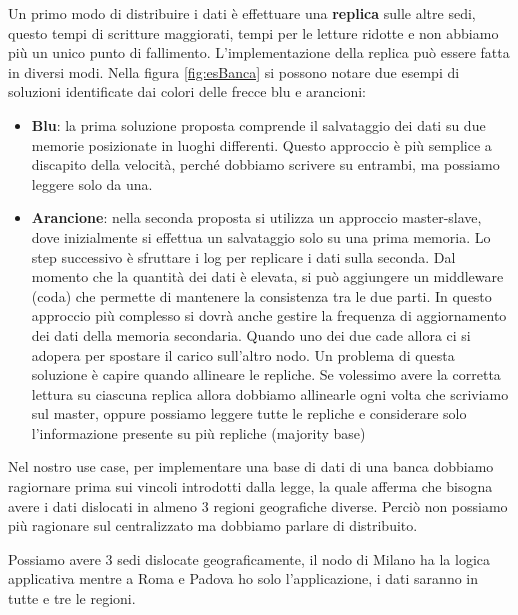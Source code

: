 Un primo modo di distribuire i dati è effettuare una \textbf{replica} sulle altre 
sedi, questo tempi di scritture maggiorati, tempi per le letture ridotte e 
non abbiamo più un unico punto di fallimento. L'implementazione della replica può
essere fatta in diversi modi. Nella figura \ref{fig:esBanca} si possono notare due 
esempi di soluzioni identificate dai colori delle frecce blu e arancioni:
\begin{itemize}
    \item \textbf{Blu}: la prima soluzione proposta comprende il salvataggio
          dei dati su due memorie posizionate in luoghi differenti. Questo approccio è più
          semplice a discapito della velocità, perché dobbiamo scrivere su entrambi,
          ma possiamo leggere solo da una.
    \item \textbf{Arancione}: nella seconda proposta si utilizza un approccio
          master-slave, dove inizialmente si effettua un salvataggio solo su una
          prima memoria. Lo step successivo è sfruttare i log per replicare i
          dati sulla seconda. Dal momento che la quantità dei dati è elevata,
          si può aggiungere un middleware (coda) che permette di mantenere la
          consistenza tra le due parti. In questo approccio più complesso si
          dovrà anche gestire la frequenza di aggiornamento dei dati della
          memoria secondaria. Quando uno dei due cade allora ci si adopera per
          spostare il carico sull'altro nodo. Un problema di questa soluzione è 
          capire quando allineare le repliche. Se volessimo avere la corretta 
          lettura su ciascuna replica allora dobbiamo allinearle ogni volta che 
          scriviamo sul master, oppure possiamo leggere tutte le repliche e 
          considerare solo l'informazione presente su più repliche (majority base)
\end{itemize}


Nel nostro use case, per implementare una base di dati di una banca dobbiamo ragiornare
prima sui vincoli introdotti dalla legge, la quale afferma che bisogna avere i
dati dislocati in almeno $3$ regioni geografiche diverse. Perciò non possiamo più
ragionare sul centralizzato ma dobbiamo parlare di distribuito.

Possiamo avere $3$ sedi dislocate geograficamente, il nodo di Milano ha la logica
applicativa mentre a Roma e Padova ho solo l'applicazione, i dati saranno in tutte
e tre le regioni.

